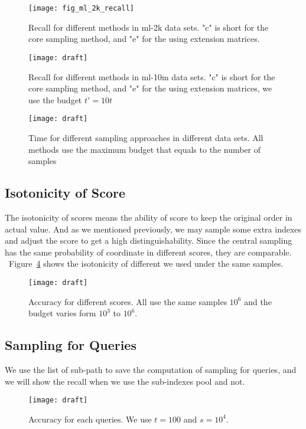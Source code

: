 \documentclass[letterpaper]{article}
\newcommand{\Fig}[1]   {Figure~\ref{fig:#1}}
\begin{document}
\begin{figure}[ht]
  \centering
  \texttt{[image: fig\_ml\_2k\_recall]}\\
  \caption{Recall for different methods in ml-2k data sets. "c" is short for the core sampling method, and "e" for the using extension matrices.}
  \label{fig:ml_2k_recall}
\end{figure}

\begin{figure}[ht]
  \centering
  \texttt{[image: draft]}\\
  \caption{Recall for different methods in ml-10m data sets. "c" is short for the core sampling method, and "e" for the using extension matrices, we use the budget $t' =10t$}
  \label{fig:RecallBudget}
\end{figure}

\begin{figure}[ht]
  \centering
  \texttt{[image: draft]}\\
  \caption{Time for different sampling approaches in different data sets. All methods use the maximum budget that equals to the number of samples}
  \label{fig:Time}
\end{figure}
\subsection{Isotonicity of Score}
The isotonicity of scores means the ability of score to keep the original order in actual value. And as we mentioned previously, we may sample some extra indexes and adjust the score to get a high distinguishability. Since the central sampling has the same probability of coordinate in different scores, they are comparable. ~\Fig{Isotonicity} shows the isotonicity of different we used under the same samples.
\begin{figure}[ht]
  \centering
  \texttt{[image: draft]}\\
  \caption{Accuracy for different scores. All use the same samples $10^6$ and the budget varies form $10^3$ to $10^6$.}
  \label{fig:Isotonicity}
\end{figure}

\subsection{Sampling for Queries}
We use the list of sub-path to save the computation of sampling for queries, and we will show the recall when we use the sub-indexes pool and not.
\begin{figure}[ht]
  \centering
  \texttt{[image: draft]}\\
  \caption{Accuracy for each queries. We use $t=100$ and $s=10^4$.}
  \label{fig:Queries}
\end{figure}
\end{document}

